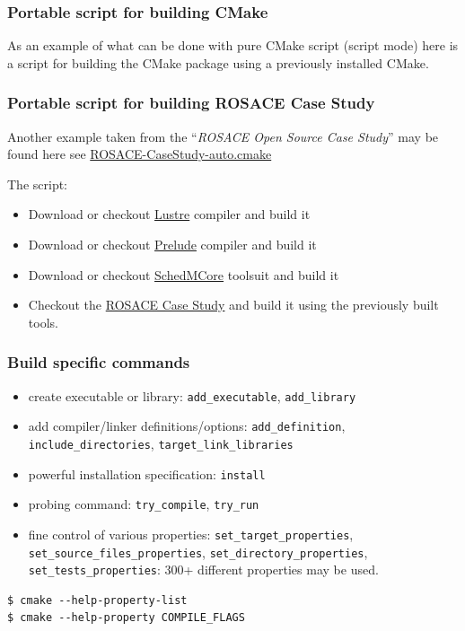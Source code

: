 \documentclass[compress,slidestop,table
              ]
               {beamer}
\begin{document}
\begin{frame}
\frametitle{Portable script for building CMake}
As an example of what can be done with pure CMake script
(script mode) here is a script for building the CMake package
using a previously installed CMake.


\end{frame}

\begin{frame}[fragile]
  \frametitle{Portable script for building ROSACE Case Study}
Another example taken from the ``\emph{ROSACE Open Source Case Study}'' may be found here
see \href{https://svn.onera.fr/schedmcore/branches/ROSACE_CaseStudy/prelude_implementations/instructions/ROSACE-CaseStudy-auto.cmake}{ROSACE-CaseStudy-auto.cmake}

The script:
\begin{itemize}
\item Download or checkout \href{https://cavale.enseeiht.fr/redmine/projects/lustrec}{Lustre} compiler and build it
\item Download or checkout \href{https://forge.onera.fr/projects/prelude}{Prelude} compiler and build it
\item Download or checkout \href{http://sites.onera.fr/schedmcore/}{SchedMCore} toolsuit and build it
\item Checkout the \href{http://sites.onera.fr/schedmcore/ROSACE}{ROSACE Case Study} and build it using the previously built tools.
\end{itemize}
\end{frame}

\begin{frame}[fragile]
\frametitle{Build specific commands}
\begin{itemize}
\item create executable or library: \lstinline!add_executable!, \lstinline!add_library!
\item add compiler/linker definitions/options: \lstinline!add_definition!, \lstinline!include_directories!,
      \lstinline!target_link_libraries!
\item powerful installation specification: \lstinline!install!
\item probing command: \lstinline!try_compile!, \lstinline!try_run!
\item fine control of various properties:
      \lstinline!set_target_properties!,
      \lstinline!set_source_files_properties!,
      \lstinline!set_directory_properties!,
      \lstinline!set_tests_properties!: \alert{300+} different properties may be used.
\end{itemize}
\begin{Verbatim}
$ cmake --help-property-list
$ cmake --help-property COMPILE_FLAGS
\end{Verbatim}
\end{frame}
\end{document}
